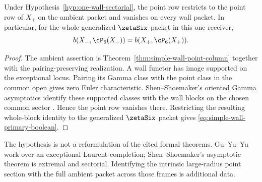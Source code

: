 \begin{corollary}
\label{cor:simple-wall-rank}
Under Hypothesis~\ref{hyp:one-wall-sectorial}, the point row restricts to the
point row of \(X_+\) on the ambient packet and vanishes on every wall packet.
In particular, for the whole generalized \(\zetaSix\) packet in this one
receiver,
\begin{equation}\label{eq:simple-wall-primary-boolean}
 b(X_-,\cP_6(X_-))=b(X_+,\cP_6(X_+)).
\end{equation}
\end{corollary}

\begin{proof}
The ambient assertion is Theorem~\ref{thm:simple-wall-point-column} together
with the pairing-preserving realization.  A wall functor has image supported
on the exceptional locus.  Pairing its Gamma class with the point class in
the common open gives zero Euler characteristic.  Shen--Shoemaker's oriented
Gamma asymptotics identify these supported classes with the wall blocks on
the chosen common sector \cite{ShenShoemaker}.  Hence the point row vanishes
there.  Restricting the resulting whole-block identity to the generalized
\(\zetaSix\) packet gives \eqref{eq:simple-wall-primary-boolean}.
\end{proof}

The hypothesis is not a reformulation of the cited formal theorems.
Gu--Yu--Yu work over an exceptional Laurent completion; Shen--Shoemaker's
asymptotic theorem is extremal and sectorial.  Identifying the intrinsic
large-radius point section with the full ambient packet across those frames
is additional data.
